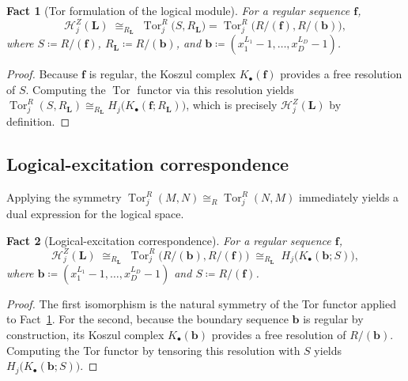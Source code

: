 \documentclass[aps,prx,english,superscriptaddress,twocolumn,tightenlines,showpacs,longbibliography,floatfix,amsfonts]{revtex4-2}
\newtheorem{fact}{Fact}
\theoremstyle{remark}
\theoremstyle{definition}
\begin{document}
\begin{fact}[Tor formulation of the logical module]
	\label{fact:tor-isomorphism}
	For a regular sequence $\mathbf{f}$,
	\begin{equation}
		\mathcal{H}_j^Z(\mathbf{L})
		\;\cong_{R_{\mathbf L}}\;
		\operatorname{Tor}_j^R\bigl(S, R_{\mathbf{L}}\bigr) = \operatorname{Tor}_j^R\bigl(R/(\mathbf{f}), R/(\mathbf{b})\bigr),
		\label{eq:L_Tor}
	\end{equation}
	where $S \coloneqq R/(\mathbf{f})$, $R_{\mathbf{L}} \coloneqq R/(\mathbf{b})$, and $\mathbf{b} \coloneqq (x_1^{L_1}-1,\dots,x_D^{L_D}-1)$.
\end{fact}
\begin{proof}
	Because $\mathbf{f}$ is regular, the Koszul complex $K_\bullet(\mathbf{f})$ provides a free resolution of $S$. Computing the $\operatorname{Tor}$ functor via this resolution yields $\operatorname{Tor}_j^R(S,R_{\mathbf{L}}) \cong_{R_{\mathbf L}} H_j\bigl(K_\bullet(\mathbf{f}; R_{\mathbf{L}})\bigr)$, which is precisely $\mathcal{H}_j^Z(\mathbf{L})$ by definition.
\end{proof}

\subsection{Logical-excitation correspondence}

Applying the symmetry $\operatorname{Tor}_j^R(M,N)\cong_R \operatorname{Tor}_j^R(N,M)$ immediately yields a dual expression for the logical space.

\begin{fact}[Logical-excitation correspondence]
	\label{fact:logical-excitation-correspondence}
	For a regular sequence $\mathbf{f}$,
	\begin{equation}
		\mathcal{H}_j^Z(\mathbf{L})
		\;\cong_{R_{\mathbf L}}\;
		\operatorname{Tor}_j^R\bigl(R/(\mathbf{b}), R/(\mathbf{f})\bigr)
		\;\cong_{R_{\mathbf L}}\;
		H_j\bigl(K_\bullet(\mathbf{b}; S)\bigr),
		\label{eq:L_Tor_sym}
	\end{equation}
	where $\mathbf{b} \coloneqq (x_1^{L_1}-1,\dots,x_D^{L_D}-1)$ and $S \coloneqq R/(\mathbf{f})$.
\end{fact}
\begin{proof}
	The first isomorphism is the natural symmetry of the Tor functor applied to Fact~\ref{fact:tor-isomorphism}. For the second, because the boundary sequence $\mathbf{b}$ is regular by construction, its Koszul complex $K_\bullet(\mathbf{b})$ provides a free resolution of $R/(\mathbf{b})$. Computing the Tor functor by tensoring this resolution with $S$ yields $H_j\bigl(K_\bullet(\mathbf{b}; S)\bigr)$.
\end{proof}
\end{document}
